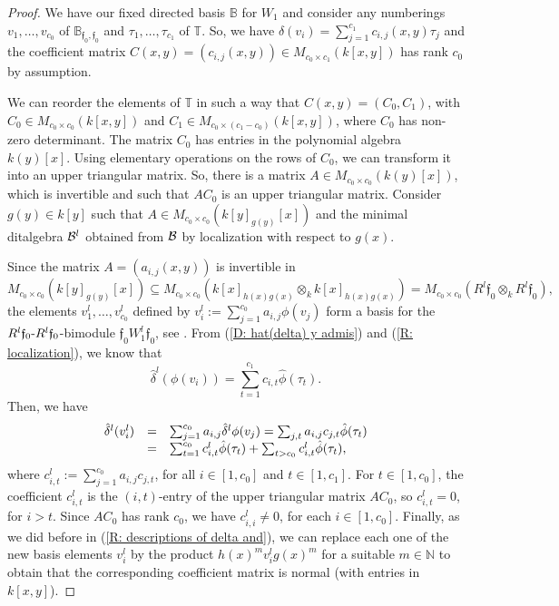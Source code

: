 \documentclass{article}
\theoremstyle{definition}
\renewcommand{\frak}{\mathfrak}
\newcommand{\g}{\hbox{-}}
\newcommand{\hueca}[1]{\mathbb{#1}}
\begin{document}
\begin{proof} We have our fixed directed basis $\hueca{B}$ for $W_1$ and consider any numberings $v_1,\ldots,v_{c_0}$ of $\hueca{B}_{\frak{f}_0,\frak{f}_0}$ and $\tau_1,\ldots,\tau_{c_1}$ of $\hueca{T}$. So, we have $\delta(v_i)=\sum_{j=1}^{c_1}c_{i,j}(x,y)\tau_j$ and the coefficient matrix $C(x,y)=(c_{i,j}(x,y))\in M_{c_0\times c_1}(k[x,y])$ has rank $c_0$ by  assumption.  

We can reorder the elements of $\hueca{T}$ in  such a way that $C(x,y)=(C_0,C_1)$, with $C_0\in M_{c_0\times c_0}(k[x,y])$ and $C_1\in M_{c_0\times (c_1-c_0)}(k[x,y])$, where $C_0$ has non-zero determinant.   The matrix $C_0$ has entries in the polynomial algebra $k(y)[x]$. Using elementary operations on the rows of $C_0$, we can transform it into an upper triangular matrix. So, there is a  matrix $A\in M_{c_0\times c_0}(k(y)[x])$, which is invertible and such that $AC_0$ is an upper triangular matrix. Consider $g(y)\in k[y]$ such that $A\in M_{c_0\times c_0}(k[y]_{g(y)}[x])$ and the minimal ditalgebra ${\cal B}^l$ obtained from ${\cal B}$ by localization with respect to $g(x)$. 

Since the matrix $A=(a_{i,j}(x,y))$ is invertible in 
$$M_{c_0\times c_0}(k[y]_{g(y)}[x])\subseteq M_{c_0\times c_0}(k[x]_{h(x)g(x)}\otimes_kk[x]_{h(x)g(x)})=
M_{c_0\times c_0}(R^l\frak{f}_0\otimes_kR^l\frak{f}_0),$$
 the elements $v^l_1,\ldots,v^l_{c_0}$ defined by 
$v^l_i:=\sum_{j=1}^{c_0}{a_{i,j}}\phi(v_j)$
form a basis for the 
$R^l\frak{f}_0\g  R^l\frak{f}_0$-bimodule 
$\frak{f}_0W_1^l\frak{f}_0$, see 
\cite[(26.1)]{BSZ}.     From (\ref{D: hat(delta) y admis}) and (\ref{R: localization}), we know that   
 $$\hat{\delta}^l(\phi(v_i))=\sum_{t=1}^{c_1}c_{i,t}\hat{\phi}(\tau_t).$$
 Then, we have 
 $$\begin{matrix}
 \hat{\delta}^l(v^l_i)
 &=&
 \sum_{j=1}^{c_0}{a_{i,j}}\hat{\delta}^l\phi(v_j)
 =\sum_{j,t}a_{i,j}c_{j,t}\hat{\phi}(\tau_t)\hfill\\
 &=&
 \sum_{t=1}^{c_0}c^l_{i,t}\hat{\phi}(\tau_t)
 +
 \sum_{t>c_0}c^l_{i,t}\hat{\phi}(\tau_t),\hfill\\ 
 \end{matrix}$$
 where $c^l_{i,t}:=\sum_{j=1}^{c_0}a_{i,j}c_{j,t}$, for all $i\in [1,c_0]$ and $t\in [1,c_1]$. For $t\in [1,c_0]$, the coefficient $c^l_{i,t}$ is the $(i,t)$-entry of the upper triangular matrix $AC_0$, so $c^l_{i,t}=0$, for $i>t$. Since $AC_0$ has rank $c_0$, we have $c^{l}_{i,i}\not=0$, for each $i\in [1,c_0]$. Finally, as we did before in (\ref{R: descriptions of delta and}), we can  replace each one of the new basis  elements 
 $v^l_i$ by the product $h(x)^mv_i^lg(x)^m$ for a suitable $m\in \hueca{N}$ to obtain that the corresponding coefficient matrix is normal (with entries in $k[x,y]$).  
\end{proof}
\end{document}
